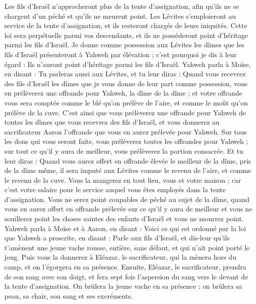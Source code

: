 \begin{multicols}{2}
Les fils d'Israël n'approcheront plus de la tente d'assignation, afin qu'ils ne se chargent d’un péché et qu'ils ne meurent point.
Les Lévites s'emploieront au service de la tente d'assignation, et ils resteront chargés de leurs iniquités. Cette loi sera perpétuelle parmi vos descendants, et ils ne posséderont point d'héritage parmi les fils d'Israël.
Je donne comme possession aux Lévites les dîmes que les fils d'Israël présenteront à Yahweh par élévation ; c'est pourquoi je dis à leur égard : Ils n'auront point d'héritage parmi les fils d'Israël.
Yahweh parla à Moïse, en disant :
Tu parleras aussi aux Lévites, et tu leur diras : Quand vous recevrez des fils d'Israël les dîmes que je vous donne de leur part comme possession, vous en prélèverez une offrande pour Yahweh, la dîme de la dîme ;
et votre offrande vous sera comptée comme le blé qu’on prélève de l'aire, et comme le moût qu’on prélève de la cuve.
C’est ainsi que vous prélèverez une offrande pour Yahweh de toutes les dîmes que vous recevrez des fils d'Israël, et vous donnerez au sacrificateur Aaron l’offrande que vous en aurez prélevée pour Yahweh.
Sur tous les dons qui vous seront faits, vous prélèverez toutes les offrandes pour Yahweh ; sur tout ce qu'il y aura de meilleur, vous prélèverez la portion consacrée.
Et tu leur diras : Quand vous aurez offert en offrande élevée le meilleur de la dîme, pris de la dîme même, il sera imputé aux Lévites comme le revenu de l'aire, et comme le revenu de la cuve.
Vous la mangerez en tout lieu, vous et votre maison ; car c’est votre salaire pour le service auquel vous êtes employés dans la tente d’assignation.
Vous ne serez point coupables de péché au sujet de la dîme, quand vous en aurez offert en offrande prélevée sur ce qu’il y aura de meilleur et vous ne souillerez point les choses saintes des enfants d’Israël et vous ne mourrez point.
\VerseOne{}Yahweh parla à Moïse et à Aaron, en disant :
Voici ce qui est ordonné par la loi que Yahweh a prescrite, en disant : Parle aux fils d'Israël, et dis-leur qu'ils t'amènent une jeune vache rousse, entière, sans défaut, et qui n'ait point porté le joug.
Puis vous la donnerez à Eléazar, le sacrificateur, qui la mènera hors du camp, et on l'égorgera en sa présence.
Ensuite, Eléazar, le sacrificateur, prendra de son sang avec son doigt, et fera sept fois l’aspersion du sang vers le devant de la tente d'assignation.
On brûlera la jeune vache en sa présence ; on brûlera sa peau, sa chair, son sang et ses excréments.

\end{multicols}
